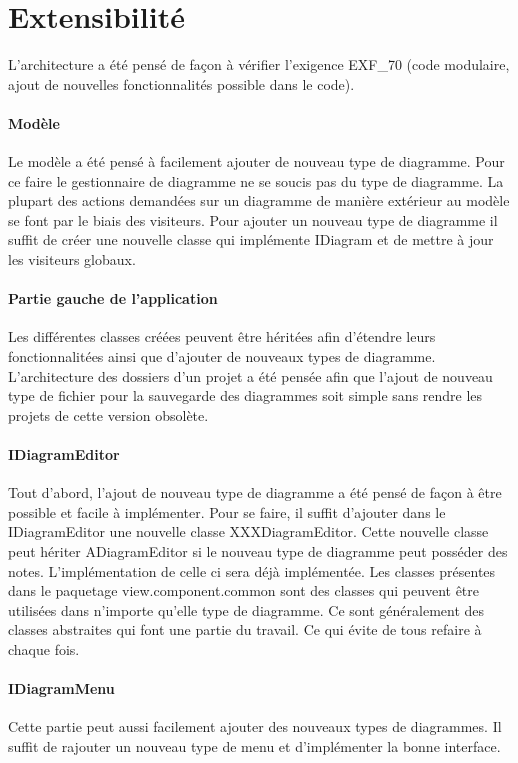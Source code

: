 \documentclass[a4paper,10pt]{article}
\begin{document}
\section{Extensibilité}
  L'architecture a été pensé de façon à vérifier l'exigence EXF\_70 (code modulaire, ajout de nouvelles fonctionnalités possible dans le code).
  \paragraph{Modèle}
    Le modèle a été pensé à facilement ajouter de nouveau type de diagramme. Pour ce faire le gestionnaire de diagramme ne se soucis pas du type de diagramme.
    La plupart des actions demandées sur un diagramme de manière extérieur au modèle se font par le biais des visiteurs. Pour ajouter un nouveau
    type de diagramme il suffit de créer une nouvelle classe qui implémente IDiagram et de mettre à jour les visiteurs globaux.
  \paragraph{Partie gauche de l'application}
    Les différentes classes créées peuvent être héritées afin d'étendre leurs fonctionnalitées ainsi que d'ajouter de nouveaux types de diagramme. 
    L'architecture des dossiers d'un projet a été pensée afin que l'ajout de nouveau type de fichier pour la sauvegarde des diagrammes
    soit simple sans rendre les projets de cette version obsolète.
  \paragraph{IDiagramEditor}
    Tout d'abord, l'ajout de nouveau type de diagramme a été pensé de façon à être possible et facile à implémenter. 
    Pour se faire, il suffit d'ajouter dans le IDiagramEditor une 
    nouvelle classe XXXDiagramEditor. Cette nouvelle classe peut hériter ADiagramEditor si le nouveau type de diagramme peut posséder des notes.
    L'implémentation de celle ci sera déjà implémentée.
    Les classes présentes dans le paquetage view.component.common sont des classes qui peuvent être utilisées dans n'importe qu'elle type de diagramme. Ce
    sont généralement des classes abstraites qui font une partie du travail. Ce qui évite de tous refaire à chaque fois.
    
  \paragraph{IDiagramMenu}
    Cette partie peut aussi facilement ajouter des nouveaux types de diagrammes. Il suffit de rajouter un nouveau type de menu et d'implémenter la bonne interface.
\end{document}
